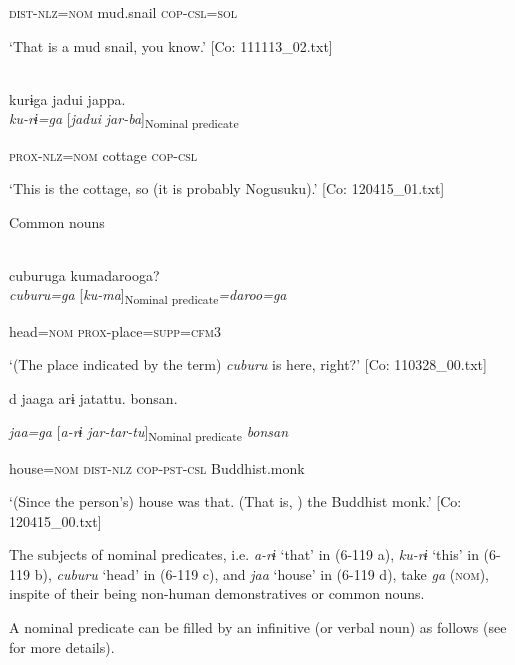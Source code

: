       \textsc{dist}-\textsc{nlz}=\textsc{nom}  mud.snail  \textsc{cop}-\textsc{csl}=\textsc{sol}

\glt ‘That is a mud snail, you know.’ [Co: 111113\_02.txt]
\z

 \ex{}\\
{\TM}
\gll  kurɨga  jadui  jappa.\\

      \textit{ku-rɨ=ga}  [\textit{jadui}  \textit{jar-ba}]\textsubscript{Nominal predicate}

      \textsc{prox}-\textsc{nlz}=\textsc{nom}  cottage  \textsc{cop}-\textsc{csl}

\glt ‘This is the cottage, so (it is probably Nogusuku).’ [Co: 120415\_01.txt]
\z

  Common nouns

 \ex{}\\
{\TM}
\gll  cuburuga  kumadarooga?\\

      \textit{cuburu=ga}  [\textit{ku-ma}]\textsubscript{Nominal predicate}\textit{=daroo=ga}

      head=\textsc{nom}  \textsc{prox}-place=\textsc{supp}=\textsc{cfm}3

\glt ‘(The place indicated by the term) \textit{cuburu} is here, right?’ [Co: 110328\_00.txt]
\z

  d  {\TM}  jaaga  arɨ  jatattu.  bonsan.

      \textit{jaa=ga}  [\textit{a-rɨ}  \textit{jar-tar-tu}]\textsubscript{Nominal predicate}  \textit{bonsan}

      house=\textsc{nom}  \textsc{dist}-\textsc{nlz}  \textsc{cop}-\textsc{pst}-\textsc{csl}  Buddhist.monk

\glt ‘(Since the person’s) house was that. (That is, ) the Buddhist monk.’ [Co: 120415\_00.txt]
\z

The subjects of nominal predicates, i.e. \textit{a-rɨ} ‘that’ in (6-119 a), \textit{ku-rɨ} ‘this’ in (6-119 b), \textit{cuburu} ‘head’ in (6-119 c), and \textit{jaa} ‘house’ in (6-119 d), take \textit{ga} (\textsc{nom}), inspite of their being non-human demonstratives or common nouns.

A nominal predicate can be filled by an infinitive (or verbal noun) as follows (see  for more details).


